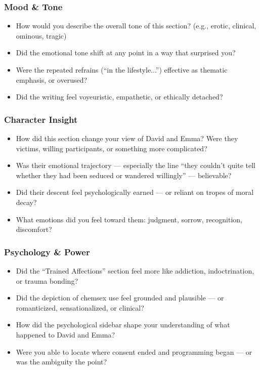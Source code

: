 \subsubsection{Mood \& Tone}

\begin{itemize}
\item How would you describe the overall tone of this section? (e.g., erotic, clinical, ominous, tragic)
\item Did the emotional tone shift at any point in a way that surprised you?
\item Were the repeated refrains (“in the lifestyle...”) effective as thematic emphasis, or overused?
\item Did the writing feel voyeuristic, empathetic, or ethically detached?
\end{itemize}

\subsubsection{Character Insight}

\begin{itemize}
\item How did this section change your view of David and Emma? Were they victims, willing participants, or something more complicated?
\item Was their emotional trajectory — especially the line “they couldn’t quite tell whether they had been seduced or wandered willingly” — believable?
\item Did their descent feel psychologically earned — or reliant on tropes of moral decay?
\item What emotions did you feel toward them: judgment, sorrow, recognition, discomfort?
\end{itemize}

\subsubsection{Psychology \& Power}

\begin{itemize}
\item Did the “Trained Affections” section feel more like addiction, indoctrination, or trauma bonding?
\item Did the depiction of chemsex use feel grounded and plausible — or romanticized, sensationalized, or clinical?
\item How did the psychological sidebar shape your understanding of what happened to David and Emma?
\item Were you able to locate where consent ended and programming began — or was the ambiguity the point?
\end{itemize}

